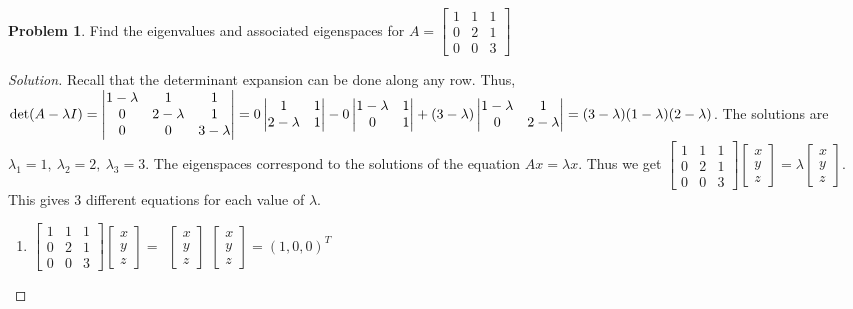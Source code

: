 \documentclass[oneside]{book}
\theoremstyle{definition}
\newtheorem{problem}{Problem}[section]
\begin{document}
\begin{problem}
Find the eigenvalues and associated eigenspaces for $A = \begin{bmatrix} 1 & 1 & 1 \\ 0 & 2 & 1 \\ 0 & 0 & 3\end{bmatrix}$
\end{problem}
\begin{proof}[Solution]
Recall that the determinant expansion can be done along any row. Thus, $\det(A-\lambda I) = \begin{vmatrix} 1-\lambda & 1 & 1 \\ 0 & 2-\lambda & 1 \\ 0 & 0 & 3-\lambda \end{vmatrix} = \\ 0\begin{vmatrix} 1 & 1 \\ 2-\lambda & 1 \end{vmatrix} - 0 \begin{vmatrix} 1-\lambda & 1 \\ 0 & 1 \end{vmatrix} + (3-\lambda)\begin{vmatrix} 1-\lambda & 1 \\ 0 & 2-\lambda\end{vmatrix} = (3-\lambda)(1-\lambda)(2-\lambda)$. The solutions are $\lambda_1 = 1,\ \lambda_2 = 2,\ \lambda_3 = 3$. The eigenspaces correspond to the solutions of the equation $Ax = \lambda x$. Thus we get $\begin{bmatrix} 1 & 1 & 1 \\ 0 & 2 & 1 \\ 0 & 0 & 3 \end{bmatrix}\begin{bmatrix} x \\ y \\ z \end{bmatrix} = \lambda \begin{bmatrix}x \\ y \\ z\end{bmatrix}$. This gives 3 different equations for each value of $\lambda$.
\begin{enumerate}
\item $\begin{bmatrix} 1 & 1 & 1 \\ 0 & 2 & 1 \\ 0 & 0 & 3 \end{bmatrix}\begin{bmatrix} x \\ y \\ z \end{bmatrix} = \ \  \begin{bmatrix}x \\ y \\ z\end{bmatrix}$\hspace{2.48 cm} $\begin{bmatrix} x \\ y \\ z \end{bmatrix} = (1,0,0)^T$

\end{enumerate}
\end{proof}
\end{document}

